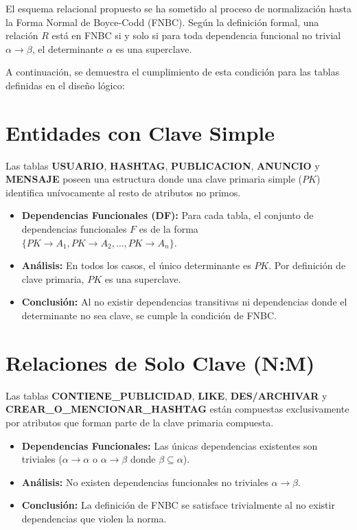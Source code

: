 \sloppy

El esquema relacional propuesto se ha sometido al proceso de normalización hasta la Forma Normal de Boyce-Codd (FNBC). Según la definición formal, una relación $R$ está en FNBC si y solo si para toda dependencia funcional no trivial $\alpha \to \beta$, el determinante $\alpha$ es una superclave.

A continuación, se demuestra el cumplimiento de esta condición para las tablas definidas en el diseño lógico:

\section*{Entidades con Clave Simple}
Las tablas \textbf{USUARIO}, \textbf{HASHTAG}, \textbf{PUBLICACION}, \textbf{ANUNCIO} y \textbf{MENSAJE} poseen una estructura donde una clave primaria simple ($PK$) identifica unívocamente al resto de atributos no primos.

\begin{itemize}
    \item \textbf{Dependencias Funcionales (DF):} Para cada tabla, el conjunto de dependencias funcionales $F$ es de la forma $\{PK \to A_1, PK \to A_2, \dots, PK \to A_n\}$.
    \item \textbf{Análisis:} En todos los casos, el único determinante es $PK$. Por definición de clave primaria, $PK$ es una superclave.
    \item \textbf{Conclusión:} Al no existir dependencias transitivas ni dependencias donde el determinante no sea clave, se cumple la condición de FNBC.
\end{itemize}

\section*{Relaciones de Solo Clave (N:M)}
Las tablas \textbf{CONTIENE\_PUBLICIDAD}, \textbf{LIKE}, \textbf{DES/ARCHIVAR} y \textbf{CREAR\_O\_MENCIONAR\_HASHTAG} están compuestas exclusivamente por atributos que forman parte de la clave primaria compuesta.

\begin{itemize}
    \item \textbf{Dependencias Funcionales:} Las únicas dependencias existentes son triviales ($\alpha \to \alpha$ o $\alpha \to \beta$ donde $\beta \subseteq \alpha$).
    \item \textbf{Análisis:} No existen dependencias funcionales no triviales $\alpha \to \beta$.
    \item \textbf{Conclusión:} La definición de FNBC se satisface trivialmente al no existir dependencias que violen la norma.
\end{itemize}

